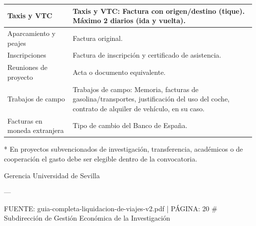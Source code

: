 \documentclass{article}
\begin{document}
\begin{itemize}
\begin{itemize}
\begin{scriptsize}
\begin{table}[h!]
\begin{tabular}{|p{}|p{}|}
                      Taxis y VTC                   & Taxis y VTC: Factura con origen/destino (tique). Máximo 2 diarios (ida y vuelta).                                                                                                                               \\\hline
                      Aparcamiento y peajes         & Factura original.                                                                                                                                                                                               \\\hline
                      Inscripciones                 & Factura de inscripción y certificado de asistencia.                                                                                                                                                             \\\hline
                      Reuniones de proyecto         & Acta o documento equivalente.                                                                                                                                                                                   \\\hline
                      Trabajos de campo             & Trabajos de campo: Memoria, facturas de gasolina/transportes, justificación del uso del coche, contrato de alquiler de vehículo, en su caso.                                                                    \\\hline
                      Facturas en moneda extranjera & Tipo de cambio del Banco de España.                                                                                                                                                                             \\\hline
                    \end{tabular}\end{table}
                  \vspace{0.4cm}

                  * En proyectos subvencionados de investigación, transferencia, académicos o de cooperación el gasto debe ser elegible dentro de la convocatoria.

                  Gerencia
                  Universidad de Sevilla

                  ---

                  FUENTE: guia-completa-liquidacion-de-viajes-v2.pdf | PÁGINA: 20
                  \# Subdirección de Gestión Económica de la Investigación


\end{scriptsize}
\end{itemize}
\end{itemize}
\end{document}

